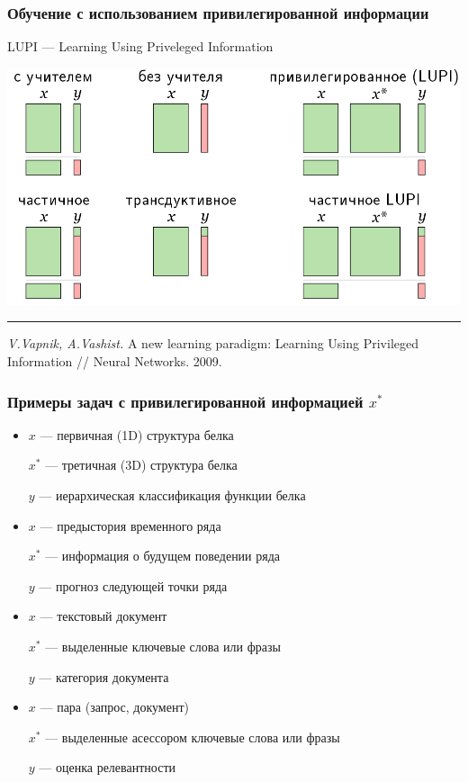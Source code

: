 \documentclass[fullscreen=true, bookmarks=true, hyperref={pdfencoding=unicode}]{beamer}
\begin{document}
\begin{frame}
  \frametitle{Обучение с использованием привилегированной информации}

  LUPI — Learning Using Priveleged Information

  \begin{center}
    \includegraphics[keepaspectratio,
                     width=.7\paperwidth]{LUPI.png}
  \end{center}

  \noindent\rule{8cm}{0.4pt}

  {\small
  {\it V.Vapnik, A.Vashist.} A new learning paradigm: Learning Using Privileged Information // Neural Networks. 2009.}
\end{frame}


\begin{frame}
  \frametitle{Примеры задач с привилегированной информацией $x^*$}
  \begin{itemize}
    \item $x$ — первичная (1D) структура белка

          $x^*$ — третичная (3D) структура белка

          $y$ — иерархическая классификация функции белка
    \item $x$ — предыстория временного ряда

          $x^*$ — информация о будущем поведении ряда

          $y$ — прогноз следующей точки ряда
    \item $x$ — текстовый документ

          $x^*$ — выделенные ключевые слова или фразы

          $y$ — категория документа
    \item $x$ — пара (запрос, документ)

          $x^*$ — выделенные асессором ключевые слова или фразы

          $y$ — оценка релевантности
  \end{itemize}
\end{frame}
\end{document}
